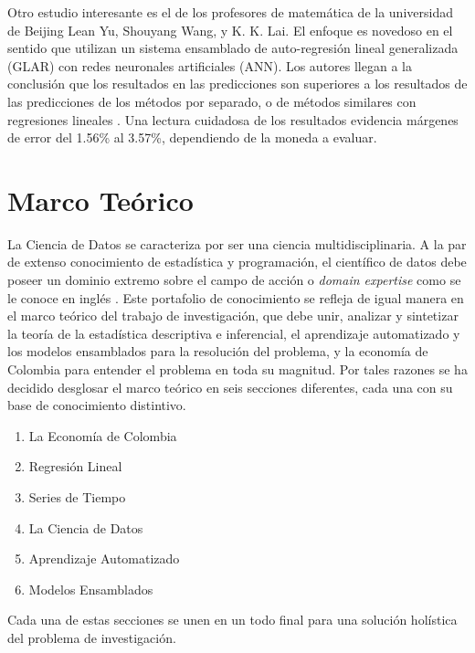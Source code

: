 Otro estudio interesante es el de los profesores de matemática de la universidad de Beijing Lean Yu, Shouyang Wang, y K. K. Lai. El enfoque es novedoso en el sentido que utilizan un sistema ensamblado de auto-regresión lineal generalizada (GLAR) con redes neuronales artificiales (ANN). Los autores llegan a la conclusión que los resultados en las predicciones son superiores a los resultados de las predicciones de los métodos por separado, o de métodos similares con regresiones lineales \cite{yuWangLai}. Una lectura cuidadosa de los resultados evidencia márgenes de error del 1.56\% al 3.57\%, dependiendo de la moneda a evaluar.

\section{Marco Teórico}
La Ciencia de Datos se caracteriza por ser una ciencia multidisciplinaria. A la par de extenso conocimiento de estadística y programación, el científico de datos debe poseer un dominio extremo sobre el campo de acción o \textit{domain expertise} como se le conoce en inglés \cite{pengMatsui}. Este portafolio de conocimiento se refleja de igual manera en el marco teórico del trabajo de investigación, que debe unir, analizar y sintetizar la teoría de la estadística descriptiva e inferencial, el aprendizaje automatizado y los modelos ensamblados para la resolución del problema, y la economía de Colombia para entender el problema en toda su magnitud. Por tales razones se ha decidido desglosar el marco teórico en seis secciones diferentes, cada una con su base de conocimiento distintivo. 

\begin{enumerate}
    \item La Economía de Colombia
    \item Regresión Lineal
    \item Series de Tiempo
    \item La Ciencia de Datos
    \item Aprendizaje Automatizado
    \item Modelos Ensamblados
\end{enumerate}

Cada una de estas secciones se unen en un todo final para una solución holística del problema de investigación.
